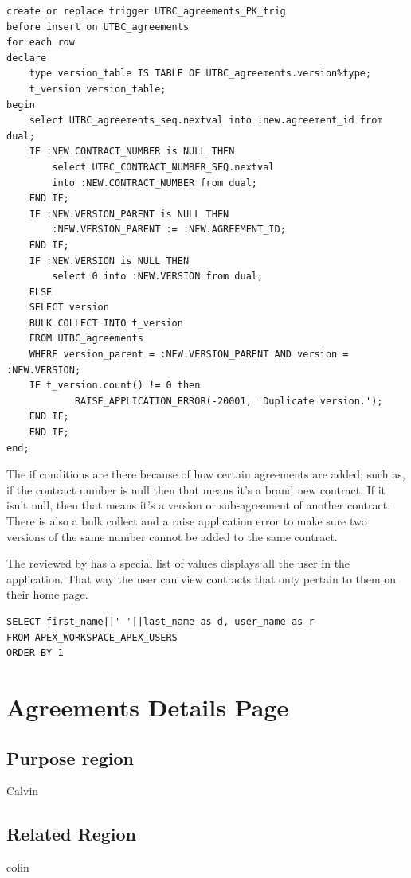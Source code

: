 \documentclass{report}
\begin{document}
\begin{lstlisting}[caption=Agreement table PK trigger]
create or replace trigger UTBC_agreements_PK_trig 
before insert on UTBC_agreements
for each row 
declare
	type version_table IS TABLE OF UTBC_agreements.version%type;
	t_version version_table;
begin 
	select UTBC_agreements_seq.nextval into :new.agreement_id from dual;
	IF :NEW.CONTRACT_NUMBER is NULL THEN
		select UTBC_CONTRACT_NUMBER_SEQ.nextval 
		into :NEW.CONTRACT_NUMBER from dual;
	END IF;
	IF :NEW.VERSION_PARENT is NULL THEN
		:NEW.VERSION_PARENT := :NEW.AGREEMENT_ID;
	END IF;
	IF :NEW.VERSION is NULL THEN
		select 0 into :NEW.VERSION from dual;
	ELSE 
  	SELECT version
  	BULK COLLECT INTO t_version 
  	FROM UTBC_agreements 
  	WHERE version_parent = :NEW.VERSION_PARENT AND version = :NEW.VERSION;
  	IF t_version.count() != 0 then
    		RAISE_APPLICATION_ERROR(-20001, 'Duplicate version.');
  	END IF;
	END IF;
end; 
\end{lstlisting}

The if conditions are there because of how certain agreements are added; such as, if the contract number is null then that means it's a brand new contract. If it isn't null, then that means it's a version or sub-agreement of another contract. There is also a bulk collect and a raise application error to make sure two versions of the same number cannot be added to the same contract.

The reviewed by has a special list of values displays all the user in the application. That way the user can view contracts that only pertain to them on their home page.

\begin{lstlisting}[caption=Reviewed by List of Values]
SELECT first_name||' '||last_name as d, user_name as r
FROM APEX_WORKSPACE_APEX_USERS
ORDER BY 1
\end{lstlisting}


\section{Agreements Details Page}

\subsection{Purpose region}
Calvin

\subsection{Related Region}
colin
\end{document}
